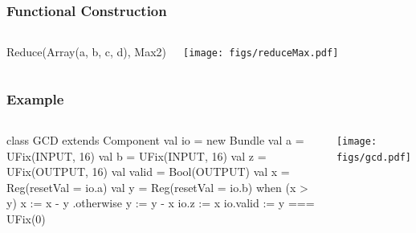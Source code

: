 \documentclass[xcolor=pdflatex,dvipsnames,table]{beamer}
\begin{document}
\begin{frame}[fragile]
\frametitle{Functional Construction}

\begin{columns}


\begin{scala}
Reduce(Array(a, b, c, d), Max2)
\end{scala}


\begin{center}
\texttt{[image: figs/reduceMax.pdf]} \\
\end{center}

\end{columns}

\end{frame}

\begin{frame}[fragile]
\frametitle{Example}
\begin{columns}


\begin{footnotesize}
\begin{scala}
class GCD extends Component {
  val io = new Bundle {
    val a     = UFix(INPUT, 16)
    val b     = UFix(INPUT, 16)
    val z     = UFix(OUTPUT, 16)
    val valid = Bool(OUTPUT) }
  val x = Reg(resetVal = io.a)
  val y = Reg(resetVal = io.b)
  when (x > y) {
    x := x - y
  } .otherwise {
    y := y - x
  }
  io.z     := x
  io.valid := y === UFix(0)
}
\end{scala}
\end{footnotesize}


\begin{center}
\texttt{[image: figs/gcd.pdf]} 
\end{center}

\end{columns}
\end{frame}
\end{document}
